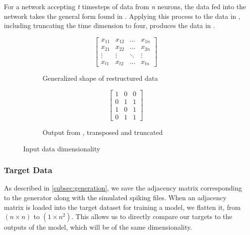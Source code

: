 For a network accepting \textit{t} timesteps of data from \textit{n} neurons, 
the data fed into the network takes the general form found in 
. Applying this process to the data in 
, including truncating the time dimension to four, produces 
the data in .
\begin{figure}[H]
	\centering
	\begin{subfigure}{.48\textwidth}
	\[ \begin{bmatrix}
		x_{11} & x_{12} & \dots & x_{1n}\\
		x_{21} & x_{22} & \dots & x_{2n}\\
		\vdots & \vdots & \ddots & \vdots\\
		x_{t1} & x_{t2} & \dots & x_{tn}
	\end{bmatrix} \]
	\caption{Generalized shape of restructured data}
	\label{subfig:genlform}
	\end{subfigure}
	\begin{subfigure}{.48\textwidth}
		\[
			\begin{bmatrix}
				1 & 0 & 0\\
				0 & 1 & 1\\
				1 & 0 & 1\\
				0 & 1 & 1
			\end{bmatrix}
		\]
		\caption{Output from , transposed and truncated}
		\label{subfig:truncdata}
	\end{subfigure}
	\caption{Input data dimensionality}
	\label{fig:datadims}
\end{figure}

\subsubsection{Target Data}
\label{subsubsec:targetdata}
As described in \ref{subsec:generation}, we save the adjacency matrix 
corresponding to the generator along with the simulated spiking files. When an 
adjacency matrix is loaded into the target dataset for training a model, we 
flatten it, from $(n \times n)$ to $(1 \times n^2)$. This allows us to directly 
compare our targets to the outputs of the model, which will be of the same 
dimensionality.

